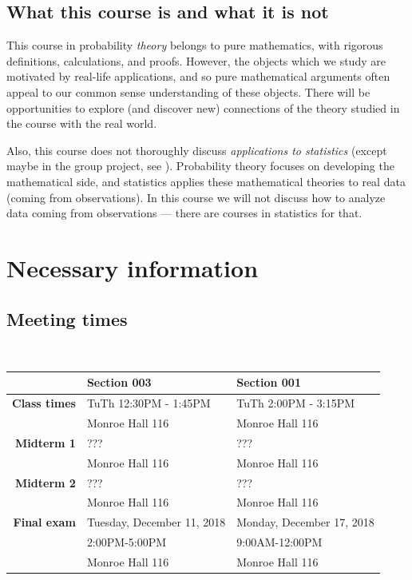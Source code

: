 \documentclass[oneside,11pt]{amsart}
\begin{document}
\subsection*{What this course is and what it is not}

This course in probability \emph{theory} belongs to pure mathematics, with
rigorous definitions, calculations, and proofs. However, the objects which we
study are motivated by real-life applications, and so pure mathematical
arguments often appeal to our common sense understanding of these objects.
There will be opportunities to explore (and discover new) connections of the
theory studied in the course with the real world.

Also, this course does not thoroughly discuss \emph{applications to statistics}
(except maybe in the group project, see ).  Probability
theory focuses on developing the mathematical side, and statistics applies
these mathematical theories to real data (coming from observations). In this
course we will not discuss how to analyze data coming from observations ---
there are courses in statistics for that.

\section{Necessary information}

\subsection{Meeting times}{\ }\\

\begin{tabular}{|r|l|l|}
	\hline
	&Section 003&Section 001
	\\
	\hline
	\textbf{Class times}  & TuTh 12:30PM - 1:45PM &TuTh 2:00PM - 3:15PM
                       \\  & Monroe Hall 116 & Monroe Hall 116
                       \\ \hline
	\textbf{Midterm 1}   & ??? & ??? 
                       \\  & Monroe Hall 116& Monroe Hall 116
                       \\ \hline
	\textbf{Midterm 2}   & ??? & ???
                       \\  & Monroe Hall 116& Monroe Hall 116
                       \\ \hline
	\textbf{Final exam}   &  Tuesday, December 11, 2018 & Monday, December 17, 2018
											 \\ & 2:00PM-5:00PM &  9:00AM-12:00PM
                       \\  & Monroe Hall 116& Monroe Hall 116 
                       \\ \hline
\end{tabular}
\end{document}
